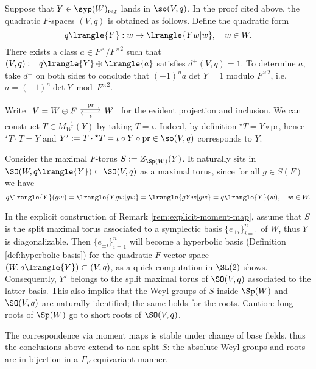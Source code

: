\documentclass[a4paper,10pt]{article}
\begin{document}
\begin{remark}\label{rem:explicit-moment-map}
	Suppose that $Y \in \syp(W)_\text{reg}$ lands in $\so(V,q)$. In the proof cited above, the quadratic $F$-spaces $(V,q)$ is obtained as follows. Define the quadratic form
	\[ q\lrangle{Y}: w \mapsto \lrangle{Yw|w}, \quad w \in W. \]
	There exists a class $a \in F^\times/F^{\times 2}$ such that $(V,q) := q\lrangle{Y} \oplus \lrangle{a}$ satisfies $d^\pm(V,q)=1$. To determine $a$, take $d^\pm$ on both sides to conclude that $(-1)^n a \det Y = 1$ modulo $F^{\times 2}$, i.e. $a = (-1)^n \det Y \bmod F^{\times 2}$.

	Write
	$\begin{tikzcd}
	V = W \oplus F \arrow[yshift=2pt]{r}{\text{pr}} & W \arrow[yshift=-2pt]{l}{\iota}
	\end{tikzcd}$ for the evident projection and inclusion. We can construct $T \in M_W^{-1}(Y)$ by taking $T = \iota$. Indeed, by definition ${}^\star T = Y \circ \text{pr}$, hence ${}^\star T \cdot T = Y$ and $Y' := T \cdot {}^\star T = \iota \circ Y \circ \text{pr} \in \so(V,q)$ corresponds to $Y$.
	
	Consider the maximal $F$-torus $S := Z_{\Sp(W)}(Y)$. It naturally sits in $\SO(W, q\lrangle{Y}) \subset \SO(V,q)$ as a maximal torus, since for all $g \in S(F)$ we have
	\[ q\lrangle{Y}(gw) = \lrangle{Ygw|gw} = \lrangle{gYw|gw} = q\lrangle{Y}(w), \quad w \in W. \]
\end{remark}

\begin{remark}\label{rem:moment-map-basis}
	In the explicit construction of Remark \ref{rem:explicit-moment-map}, assume that $S$ is the split maximal torus associated to a symplectic basis $\{ e_{\pm i} \}_{i=1}^n$ of $W$, thus $Y$ is diagonalizable. Then $\{e_{\pm i}\}_{i=1}^n$ will become a hyperbolic basis (Definition \ref{def:hyperbolic-basis}) for the quadratic $F$-vector space $(W, q\lrangle{Y}) \subset (V, q)$, as a quick computation in $\SL(2)$ shows. Consequently, $Y'$ belongs to the split maximal torus of $\SO(V,q)$ associated to the latter basis. This also implies that the Weyl groups of $S$ inside $\Sp(W)$ and $\SO(V,q)$ are naturally identified; the same holds for the roots. Caution: long roots of $\Sp(W)$ go to short roots of $\SO(V,q)$.
	
	The correspondence via moment maps is stable under change of base fields, thus the conclusions above extend to non-split $S$: the absolute Weyl groups and roots are in bijection in a $\Gamma_F$-equivariant manner.
\end{remark}
\end{document}
